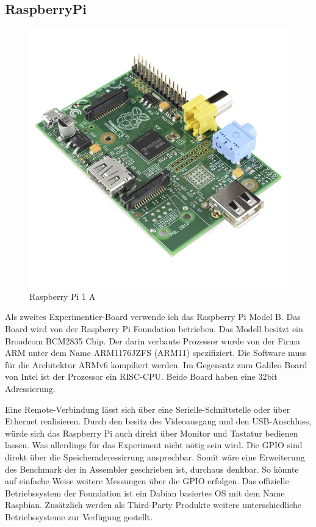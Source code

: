 \subsection{RaspberryPi}


\begin{figure}
\centering
\includegraphics[scale=0.4]{images/raspberry-pi-2.png}
\caption{Raspberry Pi 1 A\cite{raspberry_image}}
\label{fig:Raspberry Pi 1 A}
\end{figure}


Als zweites Experimentier-Board verwende ich das Raspberry Pi Model B\cite{raspberry_foundation}. Das Board wird von der Raspberry Pi Foundation betrieben. Das Modell besitzt ein Broadcom BCM2835\cite{broadcom_datasheet} Chip. Der darin verbaute Prozessor wurde von der Firma ARM unter dem Name ARM1176JZFS\cite{arm_datasheet} (ARM11) spezifiziert. Die Software muss für die Architektur ARMv6 kompiliert werden. Im Gegensatz zum Galileo Board von Intel ist der Prozessor ein RISC-CPU. Beide Board haben eine 32bit Adressierung.
\par
Eine Remote-Verbindung lässt sich über eine Serielle-Schnittstelle oder über Ethernet realisieren. Durch den besitz des Videoausgang und den USB-Anschluss, würde sich das Raspberry Pi auch direkt über Monitor und Tastatur bedienen lassen. Was allerdings für das Experiment nicht nötig sein wird. Die GPIO sind direkt über die Speicheraderessirrung ansprechbar. Somit wäre eine Erweiterung des Benchmark der in Assembler geschrieben ist, durchaus denkbar. So könnte auf einfache Weise weitere Messungen über die GPIO erfolgen. Das offizielle Betriebssystem der Foundation ist ein Dabian basiertes OS mit dem Name Raspbian. Zusätzlich werden als Third-Party Produkte weitere unterschiedliche Betriebssysteme zur Verfügung gestellt. 











